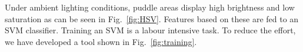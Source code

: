 Under ambient lighting conditions, puddle areas display high
brightness and low saturation as can be seen in
Fig.~\ref{fig:HSV}. Features based on these are fed to an SVM
classifier. Training an SVM is a labour intensive task.  To reduce the
effort, we have developed a tool shown in
Fig.~\ref{fig:training}. 

 




